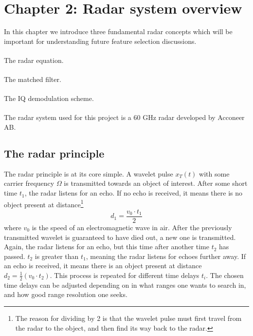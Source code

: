 \documentclass[a4paper, 12pt]{article}
\begin{document}





\section{Chapter 2: Radar system overview}

In this chapter we introduce three fundamental radar concepts which will be important for understanding future feature selection discussions. 
\\ \\
The radar equation.
\\ \\
The matched filter.
\\ \\
The IQ demodulation scheme. 
\\ \\
The radar system used for this project is a 60 GHz radar developed by Acconeer AB.

\subsection{The radar principle}

The radar principle is at its core simple.  A wavelet pulse $x_T(t)$ with some carrier frequency $\Omega$  is transmitted towards an object of interest. After some short time $t_1$, the radar listens for an echo. If no echo is received, it means there is no object present at distance\footnote{The reason for dividing by 2 is that the wavelet pulse must first travel from the radar to the object, and then find its way back to the radar.}
\begin{equation}
	d_1 = \frac{v_0\cdot t_1}2
\end{equation}
where $v_0$ is the speed of an electromagnetic wave in air. After the previously transmitted wavelet is guaranteed to have died out, a new one is transmitted. Again, the radar listens for an echo, but this time after another time $t_2$ has passed. $t_2$ is greater than $t_1$, meaning the radar listens for echoes further away. If an echo is received, it means there is an object present at distance 
$
	d_2 = \frac12(v_0\cdot t_2).
$
This process is repeated for different time delays $t_i$. The chosen time delays can be adjusted depending on in what ranges one wants to search in, and how good range resolution one seeks.
\end{document}
